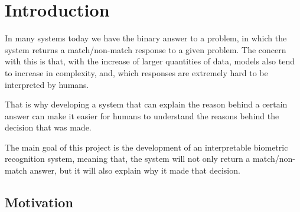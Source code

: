 \documentclass[12pt,a4paper,oneside]{memoir}
\begin{document}
\begin{acronym}[CGAN]
\end{acronym}

\begin{acronym}[GAN]
\end{acronym}


\begin{acronym}[CPU]
\end{acronym}


\begin{acronym}[IDE]
\end{acronym}

\begin{acronym}[MLP]
\end{acronym}


% 

\clearpage{\thispagestyle{empty}\cleardoublepage}

\mainmatter
\acresetall
\chapter{Introduction}
\label{chap:intro}


In many systems today we have the binary answer to a problem, in which the system returns a match/non-match response to a given problem. The concern with this is that, with the increase of larger quantities of data, models also tend to increase in complexity, and, which responses are extremely hard to be interpreted by humans. 

\par
That is why developing a system that can explain the reason behind a certain answer can make it easier for humans to understand the reasons behind the decision that was made.

\par The main goal of this project is the development of an interpretable biometric recognition system, meaning that, the system will not only return a match/non-match answer, but it will also explain why it made that decision.



\section{Motivation}
\label{sec:mot}
\end{document}
